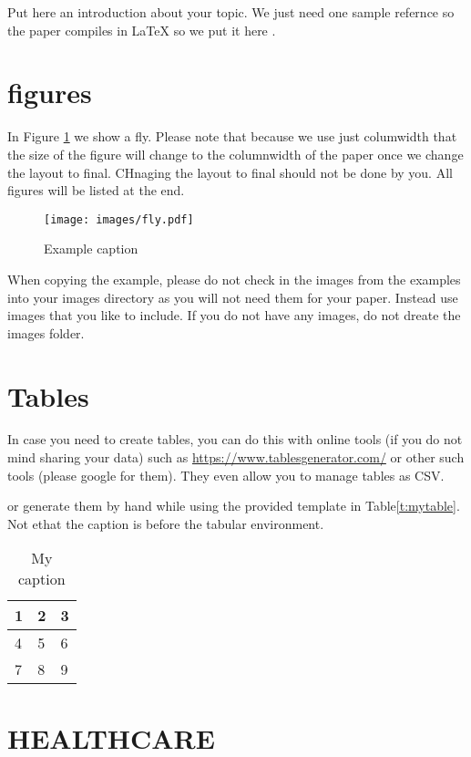 \documentclass[sigconf]{acmart}
\begin{document}
Put here an introduction about your topic. 
We just need one sample refernce so the paper compiles in LaTeX so we
put it here \cite{editor00}.

\section{figures}

In Figure \ref{f:fly} we show a fly. Please note that because we use
just columwidth that the size of the figure will change to the
columnwidth of the paper once we change the layout to final. CHnaging
the layout to final should not be done by you. All figures will be
listed at the end.

\begin{figure}[!ht]
  \centering\texttt{[image: images/fly.pdf]}
  \caption{Example caption}\label{f:fly}
\end{figure}

When copying the example, please do not check in the images from the
examples into your images directory as you will not need them for your
paper. Instead use images that you like to include. If you do not have
any images, do not dreate the images folder.

\section{Tables}

In case you need to create tables, you can do this with online tools
(if you do not mind sharing your data) such as
\url{https://www.tablesgenerator.com/} or other such tools (please
google for them). They even allow you to manage tables as CSV.

or generate them by hand while using the provided template in Table\ref{t:mytable}. Not ethat
the caption is before the tabular environment.

\begin{table}[htb]
\centering
\caption{My caption}
\label{t:mytabble}
\begin{tabular}{lll}
1 & 2 & 3 \\
\hline
4 & 5 & 6 \\
7 & 8 & 9
\end{tabular}
\end{table}

\section{HEALTHCARE}
\end{document}
